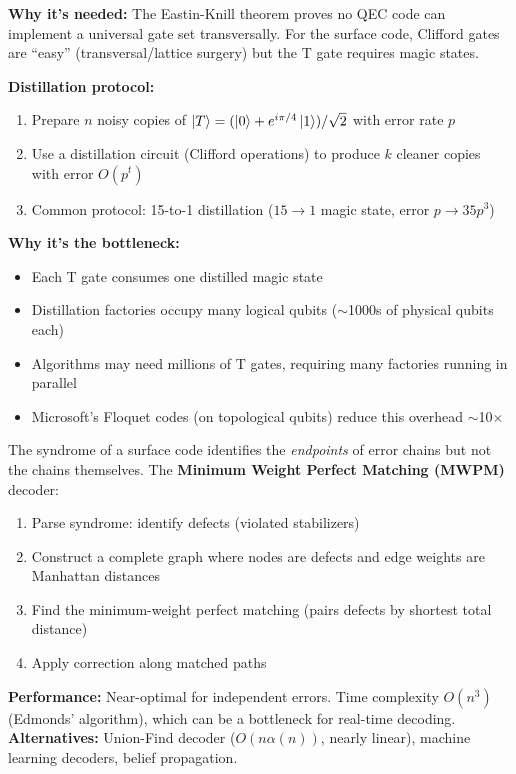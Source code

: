 \documentclass[11pt,a4paper]{article}
\begin{document}
\begin{answerbox}
\textbf{Why it's needed:} The Eastin-Knill theorem proves no QEC code can implement a universal gate set transversally. For the surface code, Clifford gates are ``easy'' (transversal/lattice surgery) but the T gate requires magic states.

\textbf{Distillation protocol:}
\begin{enumerate}
    \item Prepare $n$ noisy copies of $\ket{T} = (\ket{0} + e^{i\pi/4}\ket{1})/\sqrt{2}$ with error rate $p$
    \item Use a distillation circuit (Clifford operations) to produce $k$ cleaner copies with error $O(p^{t})$
    \item Common protocol: 15-to-1 distillation ($15 \to 1$ magic state, error $p \to 35p^3$)
\end{enumerate}
\textbf{Why it's the bottleneck:}
\begin{itemize}
    \item Each T gate consumes one distilled magic state
    \item Distillation factories occupy many logical qubits ($\sim$1000s of physical qubits each)
    \item Algorithms may need millions of T gates, requiring many factories running in parallel
    \item Microsoft's Floquet codes (on topological qubits) reduce this overhead $\sim$10$\times$
\end{itemize}
\end{answerbox}

\begin{answerbox}
The syndrome of a surface code identifies the \emph{endpoints} of error chains but not the chains themselves. The \textbf{Minimum Weight Perfect Matching (MWPM)} decoder:
\begin{enumerate}
    \item Parse syndrome: identify defects (violated stabilizers)
    \item Construct a complete graph where nodes are defects and edge weights are Manhattan distances
    \item Find the minimum-weight perfect matching (pairs defects by shortest total distance)
    \item Apply correction along matched paths
\end{enumerate}
\textbf{Performance:} Near-optimal for independent errors. Time complexity $O(n^3)$ (Edmonds' algorithm), which can be a bottleneck for real-time decoding. \textbf{Alternatives:} Union-Find decoder ($O(n\alpha(n))$, nearly linear), machine learning decoders, belief propagation.
\end{answerbox}
\end{document}
